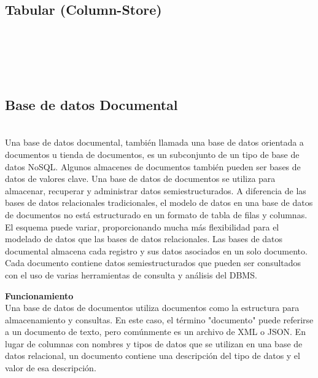 \documentclass[twoside,onecolumn]{article}
\begin{document}
\begin{flushright}
\begin{itemize}
\subsection{ Tabular (Column-Store)}

\textbf{}\\
\textbf{}\\
\textbf{}\\
\textbf{}\\



\subsection{Base de datos Documental}

\textbf{}\\Una base de datos documental, también llamada una base de datos orientada a documentos u tienda de documentos, es un subconjunto de un tipo de base de datos NoSQL.
Algunos almacenes de documentos también pueden ser bases de datos de valores clave. Una base de datos de documentos se utiliza para almacenar, recuperar y administrar datos semiestructurados.
A diferencia de las bases de datos relacionales tradicionales, el modelo de datos en una base de datos de documentos no está estructurado en un formato de tabla de filas y columnas.
El esquema puede variar, proporcionando mucha más flexibilidad para el modelado de datos que las bases de datos relacionales.
Las bases de datos documental almacena cada registro y sus datos asociados en un solo documento. Cada documento contiene datos semiestructurados que pueden ser consultados con el uso de varias herramientas de consulta y análisis del DBMS.



\textbf{Funcionamiento}\\
Una base de datos de documentos utiliza documentos como la estructura para almacenamiento y consultas. En este caso, el término "documento" puede referirse a un documento de texto, pero comúnmente es un archivo de XML o JSON. En lugar de columnas con nombres y tipos de datos que se utilizan en una base de datos relacional, un documento contiene una descripción del tipo de datos y el valor de esa descripción.


\end{itemize}
\end{flushright}
\end{document}
